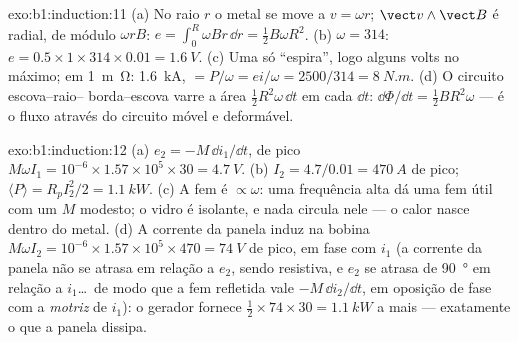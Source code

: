 \begin{solution}{exo:b1:induction:11}
(a) No raio $r$ o metal se move a $v = \omega r$; $\vect v\wedge\vect B$ é
radial, de módulo $\omega rB$: $e = \int_0^R\omega Br\,\dd r = \tfrac12B\omega R^2$.
(b) $\omega = 314$: $e = 0.5 \times 1 \times 314 \times 0.01 = \qty{1.6}{V}$. (c) Uma
só ``espira'', logo alguns volts no máximo; em \qty{1}{m\ohm}: \qty{1.6}{kA}, 
$= P/\omega = ei/\omega = 2500/314 = \qty{8}{N.m}$. (d) O circuito escova--raio--
borda--escova varre a área $\tfrac12R^2\omega\,\dd t$ em cada $\dd t$: $\dd\Phi/\dd t =
\tfrac12BR^2\omega$ --- é o fluxo através do circuito móvel e deformável.
\end{solution}

\begin{solution}{exo:b1:induction:12}
(a) $e_2 = -M\,\dd i_1/\dd t$, de pico $M\omega I_1 = 10^{-6} \times 1.57 \times 10^5 \times 30 =
\qty{4.7}{V}$. (b) $I_2 = 4.7/0.01 = \qty{470}{A}$ de pico; $\langle P\rangle = R_pI_2^2/2
= \qty{1.1}{kW}$. (c) A fem é $\propto\omega$: uma frequência alta dá uma fem
útil com um $M$ modesto; o vidro é isolante, e nada circula nele
--- o calor nasce dentro do metal. (d) A corrente da panela induz na
bobina $M\omega I_2 = 10^{-6} \times 1.57 \times 10^5 \times 470 = \qty{74}{V}$ de pico,
em fase com $i_1$ (a corrente da panela não se atrasa em relação a $e_2$, sendo
resistiva, e $e_2$ se atrasa de \qty{90}{\degree} em relação a $i_1$\ldots\ de modo que a
fem refletida vale $-M\,\dd i_2/\dd t$, em oposição de fase com a 
\emph{motriz} de $i_1$): o gerador fornece $\tfrac12 \times 74 \times 30 =
\qty{1.1}{kW}$ a mais --- exatamente o que a panela dissipa.
\end{solution}


